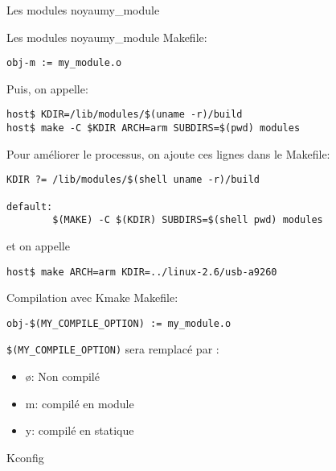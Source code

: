 \begin{frame}[fragile=singleslide]{Les modules noyau}{my\_module}
  
\end{frame}


\begin{frame}[fragile=singleslide]{Les modules noyau}{my\_module}
  Makefile:
  \begin{lstlisting}
obj-m := my_module.o  
  \end{lstlisting}
  Puis, on appelle:
  \begin{lstlisting}
host$ KDIR=/lib/modules/$(uname -r)/build
host$ make -C $KDIR ARCH=arm SUBDIRS=$(pwd) modules
  \end{lstlisting} %
  Pour améliorer le processus, on ajoute ces lignes dans le Makefile:
  \begin{lstlisting}
KDIR ?= /lib/modules/$(shell uname -r)/build

default:
        $(MAKE) -C $(KDIR) SUBDIRS=$(shell pwd) modules
  \end{lstlisting}
  et on appelle
  \begin{lstlisting}
host$ make ARCH=arm KDIR=../linux-2.6/usb-a9260 
  \end{lstlisting} %
\end{frame}

\begin{frame}[fragile=singleslide]{Compilation avec Kmake}
  Makefile:
  \begin{lstlisting}
obj-$(MY_COMPILE_OPTION) := my_module.o  
  \end{lstlisting} %
  \lstinline+$(MY_COMPILE_OPTION)+ sera remplacé par :
  \begin{itemize}
  \item ø: Non compilé
  \item m: compilé en module
  \item y: compilé en statique
  \end{itemize}
  Kconfig
  
\end{frame}


